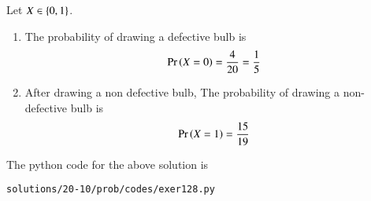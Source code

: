 Let $X \in \left\{0,1\right\}$.
\begin{enumerate}
\item The probability of drawing a defective bulb is 
\begin{align}
\Pr\left(X=0\right) = \frac{4}{20}= \frac{1}{5}
\end{align}
\item After drawing a non defective bulb,
The probability of drawing a non-defective bulb is 
\begin{align}
\Pr\left(X = 1\right)= \frac{15}{19}
\end{align}
\end{enumerate}
The python code for the above solution is
\begin{lstlisting}
solutions/20-10/prob/codes/exer128.py
\end{lstlisting}
